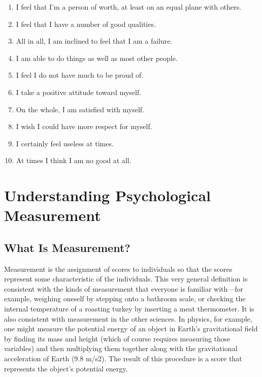 \documentclass[]{book}
\theoremstyle{definition}
\theoremstyle{definition}
\theoremstyle{remark}
\begin{document}
\begin{enumerate}
\def\labelenumi{\arabic{enumi}.}
\item
  I feel that I'm a person of worth, at least on an equal plane with
  others.
\item
  I feel that I have a number of good qualities.
\item
  All in all, I am inclined to feel that I am a failure.
\item
  I am able to do things as well as most other people.
\item
  I feel I do not have much to be proud of.
\item
  I take a positive attitude toward myself.
\item
  On the whole, I am satisfied with myself.
\item
  I wish I could have more respect for myself.
\item
  I certainly feel useless at times.
\item
  At times I think I am no good at all.
\end{enumerate}

\chapter{Understanding Psychological
Measurement}\label{understanding-psychological-measurement}

\section{What Is Measurement?}\label{what-is-measurement}

Measurement is the assignment of scores to individuals so that the
scores represent some characteristic of the individuals. This very
general definition is consistent with the kinds of measurement that
everyone is familiar with---for example, weighing oneself by stepping
onto a bathroom scale, or checking the internal temperature of a
roasting turkey by inserting a meat thermometer. It is also consistent
with measurement in the other sciences. In physics, for example, one
might measure the potential energy of an object in Earth's gravitational
field by finding its mass and height (which of course requires measuring
those variables) and then multiplying them together along with the
gravitational acceleration of Earth (9.8 m/s2). The result of this
procedure is a score that represents the object's potential energy.
\end{document}
